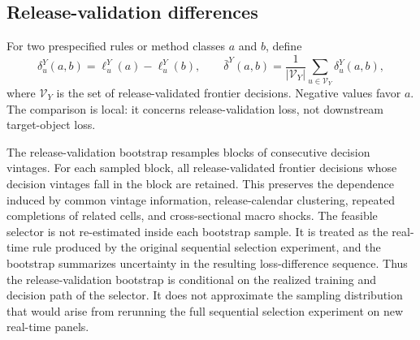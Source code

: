 \documentclass[a4paper,12pt]{article}
\newcommand{\Vcal}{\mathcal{V}}
\newcommand{\1}{\mathbf{1}}
\begin{document}
\subsection{Release-validation differences}
\label{ia:release_bootstrap}

For two prespecified rules or method classes $a$ and $b$, define
\[
\delta^Y_u(a,b)=\ell^Y_u(a)-\ell^Y_u(b),
\qquad
\bar\delta^Y(a,b)=\frac{1}{|\Vcal_Y|}\sum_{u\in\Vcal_Y}\delta^Y_u(a,b),
\]
where $\Vcal_Y$ is the set of release-validated frontier decisions. Negative values favor $a$. The comparison is local: it concerns release-validation loss, not downstream target-object loss.

The release-validation bootstrap resamples blocks of consecutive decision vintages. For each sampled block, all release-validated frontier decisions whose decision vintages fall in the block are retained. This preserves the dependence induced by common vintage information, release-calendar clustering, repeated completions of related cells, and cross-sectional macro shocks. The feasible selector is not re-estimated inside each bootstrap sample. It is treated as the real-time rule produced by the original sequential selection experiment, and the bootstrap summarizes uncertainty in the resulting loss-difference sequence. Thus the release-validation bootstrap is conditional on the realized training and decision path of the selector. It does not approximate the sampling distribution that would arise from rerunning the full sequential selection experiment on new real-time panels.
\end{document}
